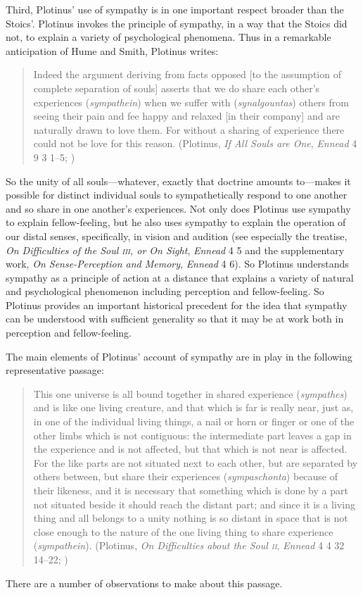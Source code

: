 Third, Plotinus' use of sympathy is in one important respect broader than the Stoics'. Plotinus invokes the principle of sympathy, in a way that the Stoics did not, to explain a variety of psychological phenomena. Thus in a remarkable anticipation of Hume and Smith, Plotinus writes:
\begin{quote}
	Indeed the argument deriving from facts opposed [to the assumption of complete separation of souls] asserts that we do share each other's experiences (\emph{sympathein}) when we suffer with (\emph{synalgountas}) others from seeing their pain and fee happy and relaxed [in their company] and are naturally drawn to love them. For without a sharing of experience there could not be love for this reason. (Plotinus, \emph{If All Souls are One}, \emph{Ennead} 4 9 3 1--5; \citealt[433--5]{Armstrong:1984aa})
\end{quote}
So the unity of all souls---whatever, exactly that doctrine amounts to---makes it possible for distinct individual souls to sympathetically respond to one another and so share in one another's experiences. Not only does Plotinus use sympathy to explain fellow-feeling, but he also uses sympathy to explain the operation of our distal senses, specifically, in vision and audition (see especially the treatise, \emph{On Difficulties of the Soul \textsc{iii}, or On Sight}, \emph{Ennead} 4 5 and the supplementary work, \emph{On Sense-Perception and Memory}, \emph{Ennead} 4 6). So Plotinus understands sympathy as a principle of action at a distance that explains a variety of natural and psychological phenomenon including perception and fellow-feeling. So Plotinus provides an important historical precedent for the idea that sympathy can be understood with sufficient generality so that it may be at work both in perception and fellow-feeling.

The main elements of Plotinus' account of sympathy are in play in the following representative passage:
\begin{quote}
	This one universe is all bound together in shared experience (\emph{sympathes}) and is like one living creature, and that which is far is really near, just as, in one of the individual living things, a nail or horn or finger or one of the other limbs which is not contiguous: the intermediate part leaves a gap in the experience and is not affected, but that which is not near is affected. For the like parts are not situated next to each other, but are separated by others between, but share their experiences (\emph{sympaschonta}) because of their likeness, and it is necessary that something which is done by a part not situated beside it should reach the distant part; and since it is a living thing and all belongs to a unity nothing is so distant in space that is not close enough to the nature of the one living thing to share experience (\emph{sympathein}). (Plotinus, \emph{On Difficulties about the Soul \textsc{ii}}, \emph{Ennead} 4 4 32 14--22; \citealt[235--7]{Armstrong:1984aa})
\end{quote}
There are a number of observations to make about this passage.

